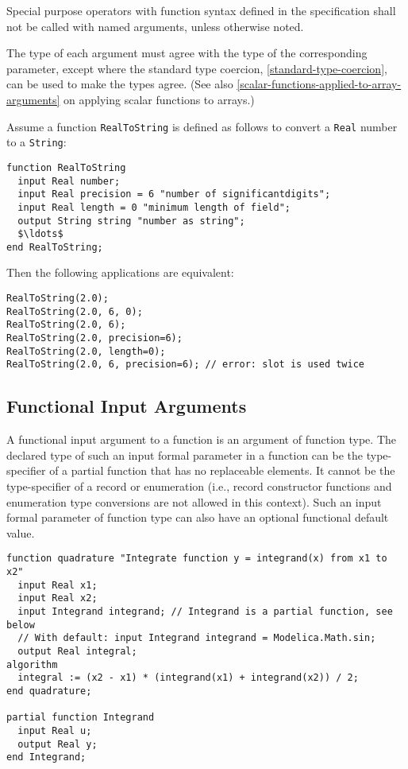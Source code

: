 Special purpose operators with function syntax defined in the specification shall not be called with named arguments, unless otherwise noted.

The type of each argument must agree with the type of the corresponding parameter, except where the standard type coercion, \cref{standard-type-coercion}, can be used to make the types agree.
(See also \cref{scalar-functions-applied-to-array-arguments} on applying scalar functions to arrays.)

\begin{example}
Assume a function \lstinline!RealToString! is defined as follows to convert a \lstinline!Real! number to a \lstinline!String!:
\begin{lstlisting}[language=modelica]
function RealToString
  input Real number;
  input Real precision = 6 "number of significantdigits";
  input Real length = 0 "minimum length of field";
  output String string "number as string";
  $\ldots$
end RealToString;
\end{lstlisting}
Then the following applications are equivalent:
\begin{lstlisting}[language=modelica]
RealToString(2.0);
RealToString(2.0, 6, 0);
RealToString(2.0, 6);
RealToString(2.0, precision=6);
RealToString(2.0, length=0);
RealToString(2.0, 6, precision=6); // error: slot is used twice
\end{lstlisting}
\end{example}

\subsection{Functional Input Arguments}\label{functional-input-arguments-to-functions}

A functional input argument to a function is an argument of function type.
The declared type of such an input formal parameter in a function can be the type-specifier of a partial function that has no replaceable elements.
It cannot be the type-specifier of a record or enumeration (i.e., record constructor functions and enumeration type conversions are not allowed in this context).
Such an input formal parameter of function type can also have an optional functional default value.

\begin{example}
\begin{lstlisting}[language=modelica]
function quadrature "Integrate function y = integrand(x) from x1 to x2"
  input Real x1;
  input Real x2;
  input Integrand integrand; // Integrand is a partial function, see below
  // With default: input Integrand integrand = Modelica.Math.sin;
  output Real integral;
algorithm
  integral := (x2 - x1) * (integrand(x1) + integrand(x2)) / 2;
end quadrature;

partial function Integrand
  input Real u;
  output Real y;
end Integrand;
\end{lstlisting}
\end{example}


